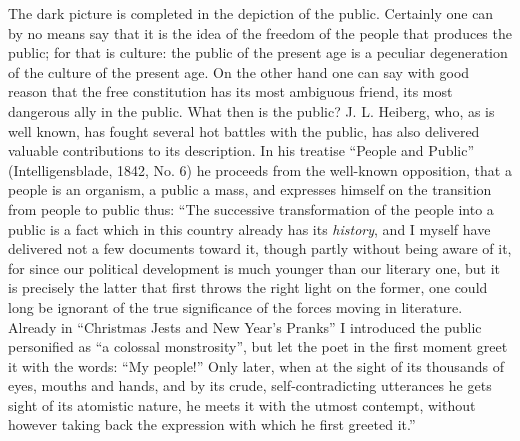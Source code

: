 \documentclass[12pt,a4paper,openany]{book}
\newcommand{\opage}[1]{\marginnote{\footnotesize\textit{[#1]}}}
\begin{document}
The dark picture is completed in the depiction of the public.
Certainly one can by no means say that it is the idea
of the freedom of the people that produces the public; for that is culture:
the public of the present age is a peculiar degeneration
of the culture of the present age. On the other hand one can say with good reason
that the free constitution has its most ambiguous friend, its most
\setcounter{footnote}{0}%
\opage{13}dangerous ally in the public. What then is the public?
J. L. Heiberg, who, as is well known, has fought several
hot battles with the public, has also delivered valuable
contributions to its description. In his treatise ``People and
Public'' (Intelligensblade, 1842, No. 6) he proceeds
from the well-known opposition, that a people is an organism,
a public a mass, and expresses himself on the transition
from people to public thus: ``The successive
transformation of the people into a public is a fact which in this country
already has its \emph{history}, and I myself have delivered
not a few documents toward it, though partly without
being aware of it, for since our political development is
much younger than our literary one, but it is precisely the latter
that first throws the right light on the former, one could
long be ignorant of the true significance of
the forces moving in literature. Already in
``Christmas Jests and New Year's Pranks'' I introduced the public personified
as ``a colossal monstrosity'', but let
the poet in the first moment greet it with the words: ``My
people!'' Only later, when at the sight of its thousands
of eyes, mouths and hands, and by its crude, self-contradicting
utterances he gets sight of its atomistic
nature, he meets it with the utmost contempt,
without however taking back the expression with which he first
greeted it.''
\end{document}
